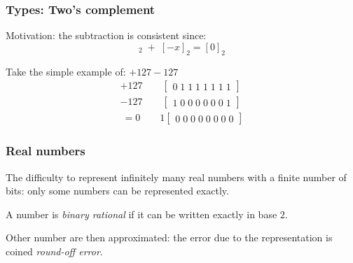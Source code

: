 \begin{frame}
  \frametitle{Types: Two's complement}

Motivation: the subtraction is consistent since:
\begin{equation*}
[+x]_2\;+\;[-x]_2 = [0]_2
\end{equation*}

\medskip
Take the simple example of: $+ 127 - 127$
\begin{equation*}
\begin{split}
+127\qquad\begin{bmatrix}0\;1\;1\;1\;1\;1\;1\;1 \end{bmatrix}\\
-127\qquad\begin{bmatrix}1\;0\;0\;0\;0\;0\;0\;1 \end{bmatrix}\\
\ = 0 \qquad 1 \begin{bmatrix}0\;0\;0\;0\;0\;0\;0\;0 \end{bmatrix}
\end{split}
\end{equation*}

\end{frame}

\begin{frame}
  \frametitle{Real numbers}

\medskip
The difficulty to represent infinitely many real numbers with a finite number of bits: only some numbers can be represented exactly.

\medskip
A number is \textit{binary rational} if it can be written exactly in base $2$.

\medskip
Other number are then approximated: the error due to the representation is coined \textit{round-off error}.

\end{frame}



